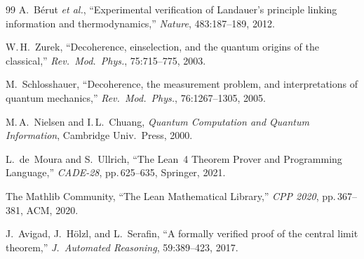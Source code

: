 \documentclass[10pt, a4paper]{article}
\begin{document}
\begin{thebibliography}{99}
 A.~B\'{e}rut \textit{et al.}, ``Experimental verification of Landauer's principle linking information and thermodynamics,'' \textit{Nature}, 483:187--189, 2012.

 W.\,H.~Zurek, ``Decoherence, einselection, and the quantum origins of the classical,'' \textit{Rev.\ Mod.\ Phys.}, 75:715--775, 2003.

 M.~Schlosshauer, ``Decoherence, the measurement problem, and interpretations of quantum mechanics,'' \textit{Rev.\ Mod.\ Phys.}, 76:1267--1305, 2005.

 M.\,A.~Nielsen and I.\,L.~Chuang, \textit{Quantum Computation and Quantum Information}, Cambridge Univ.\ Press, 2000.

 L.~de~Moura and S.~Ullrich, ``The Lean~4 Theorem Prover and Programming Language,'' \textit{CADE-28}, pp.\,625--635, Springer, 2021.

 The Mathlib Community, ``The Lean Mathematical Library,'' \textit{CPP 2020}, pp.\,367--381, ACM, 2020.

 J.~Avigad, J.~H\"{o}lzl, and L.~Serafin, ``A formally verified proof of the central limit theorem,'' \textit{J.\ Automated Reasoning}, 59:389--423, 2017.

\end{thebibliography}
\endgroup
\end{document}
